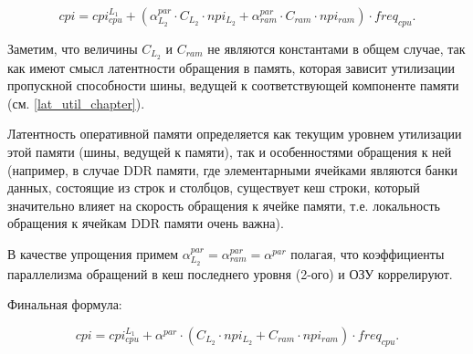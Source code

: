     \begin{equation}
        cpi = cpi_{cpu}^{L_1} +
        \left( \alpha_{L_2}^{par} \cdot C_{L_2} \cdot npi_{L_2} +
               \alpha_{ram}^{par} \cdot C_{ram} \cdot npi_{ram} \right) \cdot freq_{cpu}.
    \end{equation}

    Заметим, что величины $C_{L_2}$ и $C_{ram}$ не являются константами в общем случае, так как
    имеют смысл латентности обращения в память, которая зависит утилизации пропускной способности
    шины, ведущей к соответствующей компоненте памяти (см. \ref{lat_util_chapter}).

    Латентность оперативной памяти определяется как текущим уровнем утилизации этой памяти
    (шины, ведущей к памяти), так и особенностями обращения к ней (например, в случае DDR
    памяти, где элементарными ячейками являются банки данных, состоящие из строк и столбцов,
    существует кеш строки, который значительно влияет на скорость обращения
    к ячейке памяти, т.е. локальность обращения к ячейкам DDR памяти очень важна).

    В качестве упрощения примем $\alpha_{L_2}^{par} = \alpha_{ram}^{par} = \alpha^{par}$ полагая,
    что коэффициенты параллелизма обращений в кеш последнего уровня (2-ого) и ОЗУ коррелируют.

    Финальная формула:

    \begin{equation} \label{cpi_formula}
        cpi = cpi_{cpu}^{L_1} + \alpha^{par} \cdot
        \left( C_{L_2} \cdot npi_{L_2} + C_{ram} \cdot npi_{ram} \right) \cdot freq_{cpu}.
    \end{equation}

